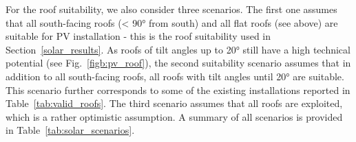 For the roof suitability, we also consider three scenarios. The first one assumes that all south-facing roofs (< 90° from south) and all flat roofs (see above) are suitable for PV installation - this is the roof suitability used in Section~\ref{solar_results}. As roofs of tilt angles up to 20° still have a high technical potential (see Fig.~\ref{figb:pv_roof}), the second suitability scenario assumes that in addition to all south-facing roofs, all roofs with tilt angles until 20° are suitable. 
This scenario further corresponds to some of the existing installations reported in Table~\ref{tab:valid_roofs}.
The third scenario assumes that all roofs are exploited, which is a rather optimistic assumption.
A summary of all scenarios is provided in Table~\ref{tab:solar_scenarios}.


